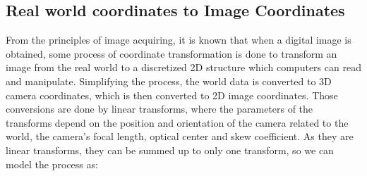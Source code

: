 \documentclass[]{IEEEtran}
\begin{document}
\subsection{Real world coordinates to Image Coordinates}
From the principles of image acquiring, it is known that when a digital image is obtained, some process of coordinate transformation is done to transform an image from the real world to a discretized 2D structure which computers can read and manipulate. Simplifying the process, the world data is converted to 3D camera coordinates, which is then converted to 2D image coordinates. Those conversions are done by linear transforms, where the parameters of the transforms depend on the position and orientation of the camera related to the world, the camera's focal length, optical center and skew coefficient. As they are linear transforms, they can be summed up to only one transform, so we can model the process as:
\end{document}
